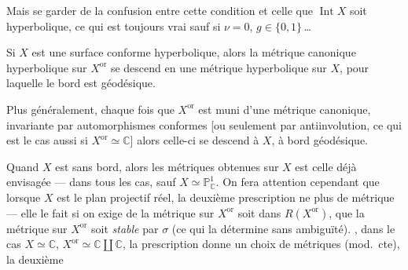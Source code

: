 \documentclass[11pt,a4paper]{article}
\begin{document}
Mais se garder de la confusion entre cette condition et celle que
$\operatorname{Int} X$ soit hyperbolique, ce qui est toujours vrai sauf si
$\nu = 0$, $g \in \{0, 1\}$\,…


Si $X$ est une surface conforme hyperbolique, alors la métrique canonique
hyperbolique sur $X^{\mathrm{or}}$ se descend en une métrique hyperbolique
sur $X$, pour laquelle le bord est géodésique.

Plus généralement, chaque fois que $X^{\mathrm{or}}$ est muni d'une métrique
canonique, invariante par automorphismes conformes [ou seulement par
antiinvolution, ce qui est le cas aussi si
$X^{\mathrm{or}} \simeq \mathbb{C}$] alors celle-ci se descend à $X$, à bord
géodésique.

Quand $X$ est sans bord, \struck{\ill{}} alors  les métriques
obtenues sur $X$ est celle déjà envisagée — 
 dans tous les cas, sauf
$X \simeq \mathbb{P}^{1}_{\mathbb{C}}$. On fera attention cependant que
lorsque $X$ est le plan projectif réel, la deuxième prescription ne
 plus de métrique — elle le fait si on exige de la
métrique sur $X^{\mathrm{or}}$ soit dans $R(X^{\mathrm{or}})$, que la
métrique sur $X^{\mathrm{or}}$ soit \emph{stable} par $\sigma$ (ce qui la
détermine \struck{\ill{}} sans ambiguïté). , dans le cas
$X \simeq \mathbb{C}$, $X^{\mathrm{or}} \simeq \mathbb{C} \amalg \mathbb{C}$,
la prescription donne un choix de métriques (mod.\ cte), la deuxième
\end{document}
